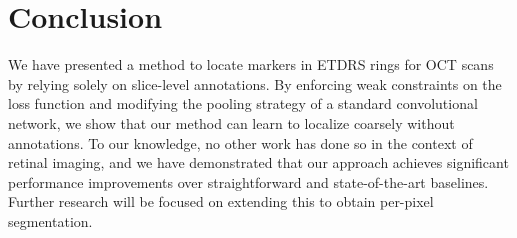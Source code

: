 \section{Conclusion}
We have presented a method to locate markers in ETDRS rings for OCT scans by relying solely on slice-level annotations. By enforcing weak constraints on the loss function and modifying the pooling strategy of a standard convolutional network, we show that our method can learn to localize coarsely without annotations. To our knowledge, no other work has done so in the context of retinal imaging, and we have demonstrated that our approach achieves significant performance improvements over straightforward and state-of-the-art baselines. Further research will be focused on extending this to obtain per-pixel segmentation.